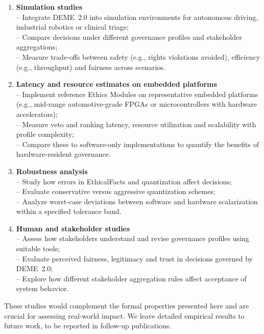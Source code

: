\documentclass[11pt]{article}
\begin{document}
\begin{enumerate}
  \item \textbf{Simulation studies}\\
  -- Integrate DEME~2.0 into simulation environments for autonomous driving, industrial robotics or clinical triage;\\
  -- Compare decisions under different governance profiles and stakeholder aggregations;\\
  -- Measure trade-offs between safety (e.g., rights violations avoided), efficiency (e.g., throughput) and fairness across scenarios.

  \item \textbf{Latency and resource estimates on embedded platforms}\\
  -- Implement reference Ethics Modules on representative embedded platforms (e.g., mid-range automotive-grade FPGAs or microcontrollers with hardware accelerators);\\
  -- Measure veto and ranking latency, resource utilization and scalability with profile complexity;\\
  -- Compare these to software-only implementations to quantify the benefits of hardware-resident governance.

  \item \textbf{Robustness analysis}\\
  -- Study how errors in EthicalFacts and quantization affect decisions;\\
  -- Evaluate conservative versus aggressive quantization schemes;\\
  -- Analyze worst-case deviations between software and hardware scalarization within a specified tolerance band.

  \item \textbf{Human and stakeholder studies}\\
  -- Assess how stakeholders understand and revise governance profiles using suitable tools;\\
  -- Evaluate perceived fairness, legitimacy and trust in decisions governed by DEME~2.0;\\
  -- Explore how different stakeholder aggregation rules affect acceptance of system behavior.
\end{enumerate}

These studies would complement the formal properties presented here and are crucial for assessing real-world impact. We leave detailed empirical results to future work, to be reported in follow-up publications.
\end{document}
